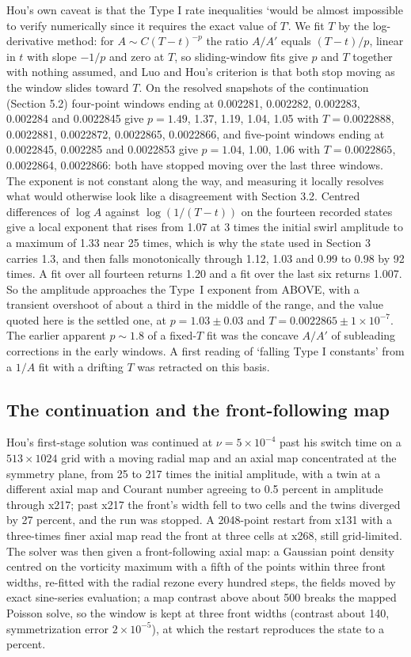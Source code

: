 \documentclass[11pt]{article}
\newcommand{\sn}[2]{#1\times 10^{#2}}
\begin{document}
Hou's own caveat \cite[Sec. 3.4]{H23b} is that the Type I rate inequalities `would be almost impossible to verify numerically since it requires the exact value of $T$'. We fit $T$ by the log-derivative method: for $A \sim C (T - t)^{-p}$ the ratio $A / A'$ equals $(T - t) / p$, linear in $t$ with slope $-1/p$ and zero at $T$, so sliding-window fits give $p$ and $T$ together with nothing assumed, and Luo and Hou's criterion \cite{LH14a,LH14b} is that both stop moving as the window slides toward $T$. On the resolved snapshots of the continuation (Section 5.2) four-point windows ending at 0.002281, 0.002282, 0.002283, 0.002284 and 0.0022845 give $p = 1.49$, 1.37, 1.19, 1.04, 1.05 with $T = 0.0022888$, 0.0022881, 0.0022872, 0.0022865, 0.0022866, and five-point windows ending at 0.0022845, 0.002285 and 0.0022853 give $p = 1.04$, 1.00, 1.06 with $T = 0.0022865$, 0.0022864, 0.0022866: both have stopped moving over the last three windows. The exponent is not constant along the way, and measuring it locally resolves what would otherwise look like a disagreement with Section 3.2. Centred differences of $\log A$ against $\log(1/(T-t))$ on the fourteen recorded states give a local exponent that rises from 1.07 at 3 times the initial swirl amplitude to a maximum of 1.33 near 25 times, which is why the state used in Section 3 carries 1.3, and then falls monotonically through 1.12, 1.03 and 0.99 to 0.98 by 92 times. A fit over all fourteen returns 1.20 and a fit over the last six returns 1.007. So the amplitude approaches the Type~I exponent from ABOVE, with a transient overshoot of about a third in the middle of the range, and the value quoted here is the settled one, at $p = 1.03 \pm 0.03$ and $T = 0.0022865 \pm \sn{1}{-7}$. The earlier apparent $p \sim 1.8$ of a fixed-$T$ fit was the concave $A / A'$ of subleading corrections in the early windows. A first reading of `falling Type I constants' from a $1/A$ fit with a drifting $T$ was retracted on this basis.

\subsection{The continuation and the front-following map}

Hou's first-stage solution was continued at $\nu = \sn{5}{-4}$ past his switch time on a $513 \times 1024$ grid with a moving radial map and an axial map concentrated at the symmetry plane, from 25 to 217 times the initial amplitude, with a twin at a different axial map and Courant number agreeing to 0.5 percent in amplitude through x217; past x217 the front's width fell to two cells and the twins diverged by 27 percent, and the run was stopped. A 2048-point restart from x131 with a three-times finer axial map read the front at three cells at x268, still grid-limited. The solver was then given a front-following axial map: a Gaussian point density centred on the vorticity maximum with a fifth of the points within three front widths, re-fitted with the radial rezone every hundred steps, the fields moved by exact sine-series evaluation; a map contrast above about 500 breaks the mapped Poisson solve, so the window is kept at three front widths (contrast about 140, symmetrization error $\sn{2}{-5}$), at which the restart reproduces the state to a percent.
\end{document}
